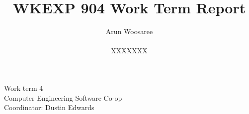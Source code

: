 \documentclass[letterpaper,12pt]{article}
\title{WKEXP 904 Work Term Report}
\author{Arun Woosaree \\ \\ XXXXXXX}
\begin{document}
\relax
\begin{titlepage}
 \maketitle
 \thispagestyle{empty} %
 \centering
 \large
 \vspace{1cm}
 Work term 4\\
 \vspace{1cm}
 Computer Engineering Software Co-op \\
 \vspace{1cm}
 Coordinator: Dustin Edwards
\end{titlepage}







\singlespacing
\nocite{*}
\printbibliography


\end{document}
